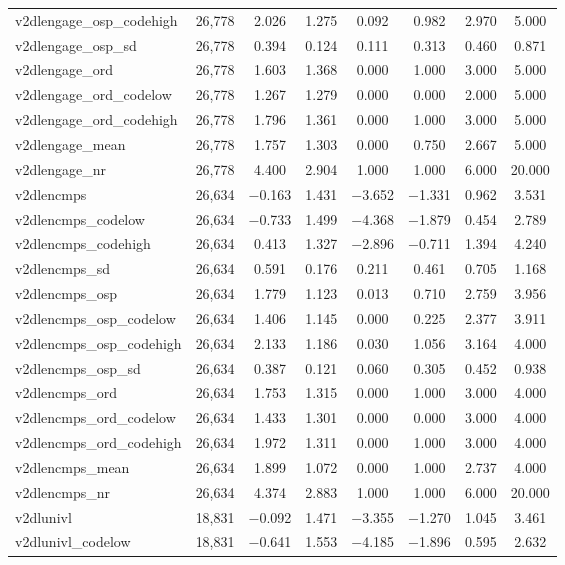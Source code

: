 \begin{table}[!htbp]
\begin{tabular}{@{\extracolsep{5pt}}lccccccc}
v2dlengage\_osp\_codehigh & 26,778 & 2.026 & 1.275 & 0.092 & 0.982 & 2.970 & 5.000 \\ 
v2dlengage\_osp\_sd & 26,778 & 0.394 & 0.124 & 0.111 & 0.313 & 0.460 & 0.871 \\ 
v2dlengage\_ord & 26,778 & 1.603 & 1.368 & 0.000 & 1.000 & 3.000 & 5.000 \\ 
v2dlengage\_ord\_codelow & 26,778 & 1.267 & 1.279 & 0.000 & 0.000 & 2.000 & 5.000 \\ 
v2dlengage\_ord\_codehigh & 26,778 & 1.796 & 1.361 & 0.000 & 1.000 & 3.000 & 5.000 \\ 
v2dlengage\_mean & 26,778 & 1.757 & 1.303 & 0.000 & 0.750 & 2.667 & 5.000 \\ 
v2dlengage\_nr & 26,778 & 4.400 & 2.904 & 1.000 & 1.000 & 6.000 & 20.000 \\ 
v2dlencmps & 26,634 & $-$0.163 & 1.431 & $-$3.652 & $-$1.331 & 0.962 & 3.531 \\ 
v2dlencmps\_codelow & 26,634 & $-$0.733 & 1.499 & $-$4.368 & $-$1.879 & 0.454 & 2.789 \\ 
v2dlencmps\_codehigh & 26,634 & 0.413 & 1.327 & $-$2.896 & $-$0.711 & 1.394 & 4.240 \\ 
v2dlencmps\_sd & 26,634 & 0.591 & 0.176 & 0.211 & 0.461 & 0.705 & 1.168 \\ 
v2dlencmps\_osp & 26,634 & 1.779 & 1.123 & 0.013 & 0.710 & 2.759 & 3.956 \\ 
v2dlencmps\_osp\_codelow & 26,634 & 1.406 & 1.145 & 0.000 & 0.225 & 2.377 & 3.911 \\ 
v2dlencmps\_osp\_codehigh & 26,634 & 2.133 & 1.186 & 0.030 & 1.056 & 3.164 & 4.000 \\ 
v2dlencmps\_osp\_sd & 26,634 & 0.387 & 0.121 & 0.060 & 0.305 & 0.452 & 0.938 \\ 
v2dlencmps\_ord & 26,634 & 1.753 & 1.315 & 0.000 & 1.000 & 3.000 & 4.000 \\ 
v2dlencmps\_ord\_codelow & 26,634 & 1.433 & 1.301 & 0.000 & 0.000 & 3.000 & 4.000 \\ 
v2dlencmps\_ord\_codehigh & 26,634 & 1.972 & 1.311 & 0.000 & 1.000 & 3.000 & 4.000 \\ 
v2dlencmps\_mean & 26,634 & 1.899 & 1.072 & 0.000 & 1.000 & 2.737 & 4.000 \\ 
v2dlencmps\_nr & 26,634 & 4.374 & 2.883 & 1.000 & 1.000 & 6.000 & 20.000 \\ 
v2dlunivl & 18,831 & $-$0.092 & 1.471 & $-$3.355 & $-$1.270 & 1.045 & 3.461 \\ 
v2dlunivl\_codelow & 18,831 & $-$0.641 & 1.553 & $-$4.185 & $-$1.896 & 0.595 & 2.632 \\ 

\end{tabular}
\end{table}
